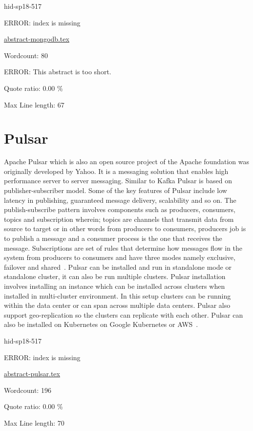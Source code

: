 \begin{IU}

hid-sp18-517

ERROR: index is missing

\href{https://github.com/cloudmesh-community/hid-sp18-517/blob/master//technology/abstract-mongodb.tex}{abstract-mongodb.tex}

 

Wordcount: 80

ERROR: This abstract is too short.


Quote ratio: 0.00 \%
 
Max Line length: 67
\end{IU}

\section{Pulsar}

Apache Pulsar which is also an open source project of the Apache
foundation was originally developed by Yahoo. It is a messaging
solution that enables high performance server to server messaging.
Similar to Kafka Pulsar is based on publisher-subscriber model.  Some
of the key features of Pulsar include low latency in publishing,
guaranteed message delivery, scalability and so on.  The
publish-subscribe pattern involves components such as producers,
consumers, topics and subscription wherein; topics are channels that
transmit data from source to target or in other words from producers
to consumers, producers job is to publish a message and a consumer
process is the one that receives the message.  Subscriptions are set
of rules that determine how messages flow in the system from producers
to consumers and have three modes namely exclusive, failover and
shared~\cite{hid-sp18-517-pulsar-apache}.  Pulsar can be installed and
run in standalone mode or standalone cluster, it can also be run
multiple clusters. Pulsar installation involves installing an instance
which can be installed across clusters when installed in multi-cluster
environment. In this setup clusters can be running within the data
center or can span across multiple data centers.  Pulsar also support
geo-replication so the clusters can replicate with each other. Pulsar
can also be installed on Kubernetes on Google Kubernetes or
AWS~\cite{hid-sp18-517-pulsar-apache}.


\begin{IU}

hid-sp18-517

ERROR: index is missing

\href{https://github.com/cloudmesh-community/hid-sp18-517/blob/master//technology/abstract-pulsar.tex}{abstract-pulsar.tex}

 

Wordcount: 196


Quote ratio: 0.00 \%
 
Max Line length: 70
\end{IU}

